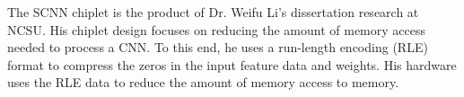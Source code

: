 \documentclass[../main.tex]{subfiles}
\begin{document}
The SCNN chiplet is the product of Dr. Weifu Li's dissertation research at NCSU\cite{LeWeifuDissertation}. His chiplet design focuses on reducing the amount of memory access needed to process a CNN. To this end, he uses a run-length encoding (RLE) format to compress the zeros in the input feature data and weights. His hardware uses the RLE data to reduce the amount of memory access to memory.
\end{document}
